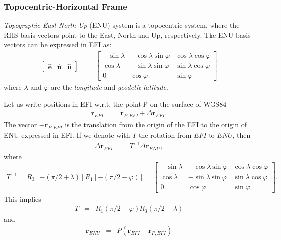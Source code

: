 \documentclass [12pt, a4paper] {article}
\newcommand{\vu}[1]
{
	\mathbf{\hat #1}
}
\newcommand{\vc}[1]
{
	\boldsymbol{#1}
}
\begin{document}
\subsubsection{Topocentric-Horizontal Frame}
\emph{Topographic East-North-Up} (ENU) system is a topocentric system, where the RHS basis vectors 
point to the East, North and Up, respectively. The ENU basis vectors can be expressed in EFI as:
\begin {eqnarray}
  \begin {bmatrix}
    \vu e & \vu n & \vu u
  \end {bmatrix}
  &=&
  \begin {bmatrix}
    - \sin\lambda & -\cos\lambda\sin\varphi & \cos\lambda\cos\varphi \\
    \cos\lambda & -\sin\lambda\sin\varphi & \sin\lambda\cos\varphi \\
    0 & \cos\varphi & \sin\varphi
  \end {bmatrix}
\end {eqnarray}
where $\lambda$ and $\varphi$ are the \emph{longitude} and \emph{geodetic latitude}.

Let us write positions in EFI w.r.t. the point P on the surface of WGS84
\begin {eqnarray}
  \vc r_{EFI} &=& \vc r_{P, EFI} + \Delta\vc r_{EFI}.
\end {eqnarray}
The vector $-\vc r_{P, EFI}$ is the translation from the origin of the EFI to 
the origin of ENU expressed in EFI. 
If we denote with $T$ the rotation from $EFI$ to $ENU$, then 
\begin {eqnarray}
  \Delta\vc r_{EFI} &=& T^{-1}\Delta\vc r_{ENU},
\end {eqnarray}
where 
\begin {eqnarray}
   T^{-1}
   = R_3\left[-(\pi/2 + \lambda)\right] R_1\left[-(\pi/2 - \varphi)\right] 
   =
  \begin {bmatrix}
  - \sin\lambda & -\cos\lambda\sin\varphi & \cos\lambda\cos\varphi \\
  \cos\lambda & -\sin\lambda\sin\varphi & \sin\lambda\cos\varphi \\
  0 & \cos\varphi & \sin\varphi
  \end {bmatrix}.
\end {eqnarray}
This implies
\begin {eqnarray}
  T &=& R_1(\pi/2 - \varphi) R_3(\pi/2 + \lambda)
\end {eqnarray}
and 
\begin {eqnarray}
  \vc r_{ENU} &=& P(\vc r_{EFI} - \vc r_{P, EFI})
\end {eqnarray}
\end{document}
